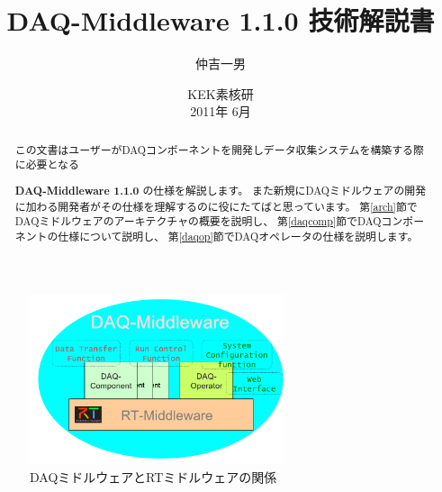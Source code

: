 \documentclass[a4j,10pt,dvips,onecolumn,oneside,final]{jarticle}%
\newcommand {\daqmwcurrent} {
	{\bf DAQ-Middleware 1.1.0}
}
\begin{document}
\title{ \daqmwcurrent 技術解説書\\
}
\author{仲吉一男}
\date{
\vspace{0.1cm}
  KEK素核研\\
\vspace{0.4cm}
  2011年 6月 
}
\maketitle
\begin{abstract}
この文書はユーザーがDAQコンポーネントを開発しデータ収集システムを構築する際に必要となる
\daqmwcurrent の仕様を解説します。
また新規にDAQミドルウェアの開発に加わる開発者がその仕様を理解するのに役にたてばと思っています。
第\ref{arch}節でDAQミドルウェアのアーキテクチャの概要を説明し、
第\ref{daqcomp}節でDAQコンポーネントの仕様について説明し、
第\ref{daqop}節でDAQオペレータの仕様を説明します。

\end{abstract}
{\rm }
\tableofcontents
\newpage

\begin{figure}
  \begin{center}
   \includegraphics[width=75mm]{daqmw-rtmw.pdf}
  \end{center}
  \vspace{-7mm}
  \caption{\footnotesize DAQミドルウェアとRTミドルウェアの関係}
  \label{daqmw.fig}
\end{figure}
\end{document}
